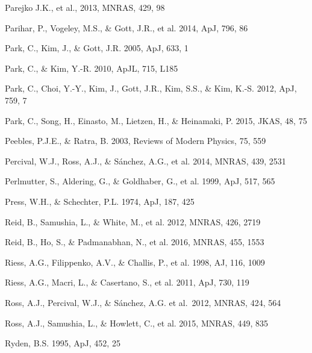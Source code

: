 \documentclass[iop]{emulateapj}
\begin{document}
\begin{thebibliography}{}
Parejko J.K., et al., 2013, MNRAS, 429, 98

Parihar, P., Vogeley, M.S., \& Gott, J.R., et al. 2014, ApJ, 796, 86

Park, C., Kim, J., \& Gott, J.R. 2005, ApJ, 633, 1  

Park, C., \& Kim, Y.-R. 2010, ApJL, 715, L185  

Park, C., Choi, Y.-Y., Kim, J., Gott, J.R., Kim, S.S., \&
Kim, K.-S. 2012, ApJ, 759, 7

Park, C., Song, H., Einasto, M., Lietzen, H., \&
Heinamaki, P. 2015, JKAS, 48, 75

Peebles, P.J.E., \& Ratra, B. 2003, Reviews of Modern Physics, 75, 559

Percival, W.J., Ross, A.J., \& S\'{a}nchez, A.G., et al. 2014, MNRAS, 439, 2531

Perlmutter, S., Aldering, G., \& Goldhaber, G., et al. 1999, ApJ, 517, 565  

Press, W.H., \& Schechter, P.L. 1974, ApJ, 187, 425

Reid, B., Samushia, L., \& White, M., et al. 2012, MNRAS, 426, 2719  

Reid, B., Ho, S., \& Padmanabhan, N., et al.  2016, MNRAS, 455, 1553

Riess, A.G., Filippenko, A.V., \& Challis, P., et al. 1998, AJ, 116, 1009  

Riess, A.G., Macri, L., \& Casertano, S., et al. 2011, ApJ, 730, 119

Ross, A.J., Percival, W.J., \& S{\'a}nchez, A.G. et al.\ 2012, MNRAS, 424, 564 

Ross, A.J., Samushia, L., \& Howlett, C., et al. 2015, MNRAS, 449, 835

Ryden, B.S. 1995, ApJ, 452, 25  


\end{thebibliography}
\end{document}
